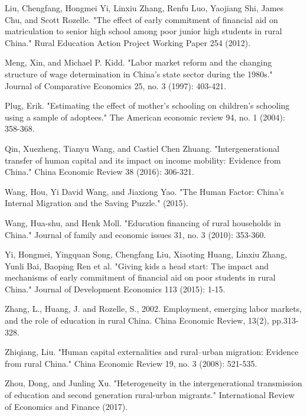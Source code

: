 \documentclass[12pt]{article}%
\theoremstyle{definition}
\numberwithin{equation}{section}
\begin{document}
\begin{thebibliography}{1}
Liu, Chengfang, Hongmei Yi, Linxiu Zhang, Renfu Luo, Yaojiang Shi, James Chu, and Scott Rozelle. "The effect of early commitment of financial aid on matriculation to senior high school among poor junior high students in rural China." Rural Education Action Project Working Paper 254 (2012).

Meng, Xin, and Michael P. Kidd. "Labor market reform and the changing structure of wage determination in China's state sector during the 1980s." Journal of Comparative Economics 25, no. 3 (1997): 403-421.

Plug, Erik. "Estimating the effect of mother's schooling on children's schooling using a sample of adoptees." The American economic review 94, no. 1 (2004): 358-368.

Qin, Xuezheng, Tianyu Wang, and Castiel Chen Zhuang. "Intergenerational transfer of human capital and its impact on income mobility: Evidence from China." China Economic Review 38 (2016): 306-321.

Wang, Hou, Yi David Wang, and Jiaxiong Yao. "The Human Factor: China’s Internal Migration and the Saving Puzzle." (2015).

Wang, Hua-shu, and Henk Moll. "Education financing of rural households in China." Journal of family and economic issues 31, no. 3 (2010): 353-360.

Yi, Hongmei, Yingquan Song, Chengfang Liu, Xiaoting Huang, Linxiu Zhang, Yunli Bai, Baoping Ren et al. "Giving kids a head start: The impact and mechanisms of early commitment of financial aid on poor students in rural China." Journal of Development Economics 113 (2015): 1-15.

Zhang, L., Huang, J. and Rozelle, S., 2002. Employment, emerging labor markets, and the role of education in rural China. China Economic Review, 13(2), pp.313-328.

Zhiqiang, Liu. "Human capital externalities and rural–urban migration: Evidence from rural China." China Economic Review 19, no. 3 (2008): 521-535.

Zhou, Dong, and Junling Xu. "Heterogeneity in the intergenerational transmission of education and second generation rural-urban migrants." International Review of Economics and Finance (2017).


\end{thebibliography}
\end{document}
